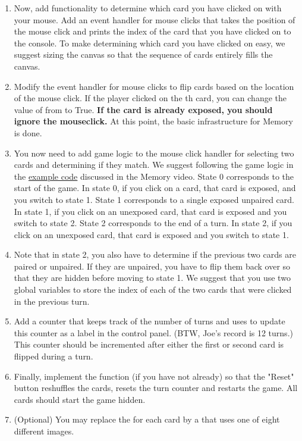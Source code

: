 \documentclass[a4paper,10pt]{article}
\begin{document}
\begin{CJK}{UTF8}{gkai}
\begin{enumerate}
\item Now, add functionality to determine which card you have clicked on with your mouse. Add an event handler for mouse clicks that takes the position of the mouse click and prints the index of the card that you have clicked on to the console. To make determining which card you have clicked on easy, we suggest sizing the canvas so that the sequence of cards entirely fills the canvas.

\item Modify the event handler for mouse clicks to flip cards based on the location of the mouse click. If the player clicked on the {\color{red}{i}}th card, you can change the value of {\color{red}{exposed[i]}} from {\color{red}{False}} to True. \textbf{If the card is already exposed, you should ignore the mouseclick.} At this point, the basic infrastructure for Memory is done.

\item You now need to add game logic to the mouse click handler for selecting two cards and determining if they match. We suggest following the game logic in the \href{http://www.codeskulptor.org/#examples-memory_states.py}{example code} discussed in the Memory video. State 0 corresponds to the start of the game. In state 0, if you click on a card, that card is exposed, and you switch to state 1. State 1 corresponds to a single exposed unpaired card. In state 1, if you click on an unexposed card, that card is exposed and you switch to state 2. State 2 corresponds to the end of a turn. In state 2, if you click on an unexposed card, that card is exposed and you switch to state 1.

\item Note that in state 2, you also have to determine if the previous two cards are paired or unpaired. If they are unpaired, you have to flip them back over so that they are hidden before moving to state 1. We suggest that you use two global variables to store the index of each of the two cards that were clicked in the previous turn.

\item Add a counter that keeps track of the number of turns and uses {\color{red}{set\_text}} to update this counter as a label in the control panel. (BTW, Joe's record is 12 turns.)  This counter should be incremented after either the first or second card is flipped during a turn.

\item Finally, implement the {\color{red}{new\_game()}} function (if you have not already) so that the "Reset" button reshuffles the cards, resets the turn counter and restarts the game. All cards should start the game hidden.
\item (Optional) You may replace the {\color{red}{draw\_text}} for each card by a {\color{red}{draw\_image}} that uses one of eight different images.



\end{enumerate}
\end{CJK}
\end{document}
